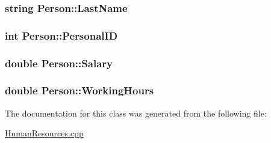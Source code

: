 \subsubsection[{\texorpdfstring{Last\+Name}{LastName}}]{\setlength{\rightskip}{0pt plus 5cm}string Person\+::\+Last\+Name\hspace{0.3cm}{\ttfamily [private]}}\hypertarget{classPerson_adb7b4b0c1c6d35ff77be67f36bfae396}{}\label{classPerson_adb7b4b0c1c6d35ff77be67f36bfae396}
\subsubsection[{\texorpdfstring{Personal\+ID}{PersonalID}}]{\setlength{\rightskip}{0pt plus 5cm}int Person\+::\+Personal\+ID\hspace{0.3cm}{\ttfamily [private]}}\hypertarget{classPerson_a4e13ba0eb54b26b2ef7b18022e609edb}{}\label{classPerson_a4e13ba0eb54b26b2ef7b18022e609edb}
\subsubsection[{\texorpdfstring{Salary}{Salary}}]{\setlength{\rightskip}{0pt plus 5cm}double Person\+::\+Salary\hspace{0.3cm}{\ttfamily [private]}}\hypertarget{classPerson_a096ebbbd6a4a7552bf385aa67e379345}{}\label{classPerson_a096ebbbd6a4a7552bf385aa67e379345}
\subsubsection[{\texorpdfstring{Working\+Hours}{WorkingHours}}]{\setlength{\rightskip}{0pt plus 5cm}double Person\+::\+Working\+Hours\hspace{0.3cm}{\ttfamily [private]}}\hypertarget{classPerson_aadb5de5c82650fdfa71c51caada68e4f}{}\label{classPerson_aadb5de5c82650fdfa71c51caada68e4f}


The documentation for this class was generated from the following file\+:\begin{DoxyCompactItemize}
\item 
\hyperlink{HumanResources_8cpp}{Human\+Resources.\+cpp}\end{DoxyCompactItemize}
